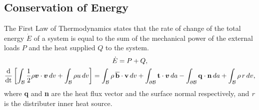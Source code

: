 \subsection{Conservation of Energy}
The First Law of Thermodynamics states that the rate of change of the total energy $\dot{E}$ of a system is equal to the
 sum of the mechanical power of the external loads $P$ and the heat supplied $Q$ to the system.
\begin{gather}\label{first_thermo}
    \dot{E} = P + Q,\\
    \frac{\mathrm{d}}{\mathrm{dt}}\left[\int_{\mathcal{B}} \frac{1}{2} \rho \mathrm{\boldsymbol{v}} \cdot \mathrm{\boldsymbol{v}} \, dv + \int_{\mathcal{B}} \rho u \, dv\right] = 
    \int_{\mathcal{B}} \rho \,\boldsymbol{\overline{\mathrm{b}}} \cdot \boldsymbol{\mathrm{v}} \, dv + \int_{\partial \mathcal{B}} \boldsymbol{\mathrm{t}} \cdot \mathrm{\boldsymbol{v}} \, da - \int_{\partial \mathcal{B}} \boldsymbol{\mathrm{q}} \cdot \boldsymbol{\mathrm{n}} \, da + \int_{\mathcal{B}} \rho \, r \,dv, \notag
\end{gather}
where \textbf{q} and \textbf{n} are the heat flux vector and the surface normal respectively, and \emph{r} is the distributer inner heat source.
